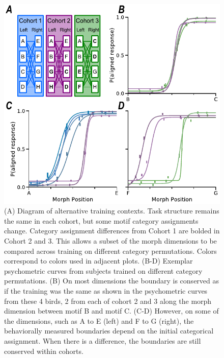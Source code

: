 \begin{figure}[tbp] 
  \centering
  \includegraphics[width=114mm]{figures/fig03_shift.pdf}
  \caption[Different training context sometimes results in reliable shifts in the psychometric curves]
{
(A)	Diagram of alternative training contexts. Task structure remains the same in each cohort, but some motif category assignments change. Category assignment differences from Cohort 1 are bolded in Cohort 2 and 3. This allows a subset of the morph dimensions to be compared across training on different category permutations. Colors correspond to colors used in adjacent plots.
(B-D)	Exemplar psychometric curves from subjects trained on different category permutations. 
(B)	On most dimensions the boundary is conserved as if the training was the same as shown in the psychometric curves from these 4 birds, 2 from each of cohort 2 and 3 along the morph dimension between motif B and motif C. 
(C-D)	However, on some of the dimensions, such as A to E (left) and F to G (right), the behaviorally measured boundaries depend on the initial categorical assignment.  When there is a difference, the boundaries are still conserved within cohorts.
}
  \label{fig:shift}
\end{figure}
